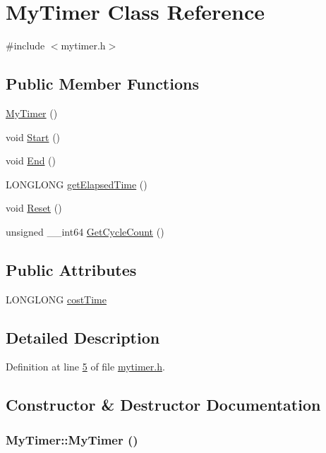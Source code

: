 \hypertarget{class_my_timer}{
\section{MyTimer Class Reference}
\label{class_my_timer}
}


{\ttfamily \#include $<$mytimer.h$>$}

\subsection*{Public Member Functions}
\begin{DoxyCompactItemize}
\item 
\hyperlink{class_my_timer_a75440365bcfd96d34be38d8a0c9c014b}{MyTimer} ()
\item 
void \hyperlink{class_my_timer_a74b18b409d493579f6b3d0972590a7a6}{Start} ()
\item 
void \hyperlink{class_my_timer_a9c499fe726dbd8a30c528727f42e993d}{End} ()
\item 
LONGLONG \hyperlink{class_my_timer_abd0f6728cf64f7b5d81235588bb8e3c2}{getElapsedTime} ()
\item 
void \hyperlink{class_my_timer_ae616c920850e8d388f93f0d354b25ba5}{Reset} ()
\item 
unsigned \_\-\_\-int64 \hyperlink{class_my_timer_ae695b0dd5d9c28c1d3dc46ba4c616eec}{GetCycleCount} ()
\end{DoxyCompactItemize}
\subsection*{Public Attributes}
\begin{DoxyCompactItemize}
\item 
LONGLONG \hyperlink{class_my_timer_adef1d73f6cbdc533c45766b6fa739154}{costTime}
\end{DoxyCompactItemize}


\subsection{Detailed Description}


Definition at line \hyperlink{mytimer_8h_source_l00005}{5} of file \hyperlink{mytimer_8h_source}{mytimer.h}.



\subsection{Constructor \& Destructor Documentation}
\hypertarget{class_my_timer_a75440365bcfd96d34be38d8a0c9c014b}{
\subsubsection[{MyTimer}]{\setlength{\rightskip}{0pt plus 5cm}MyTimer::MyTimer ()}}
\label{class_my_timer_a75440365bcfd96d34be38d8a0c9c014b}


